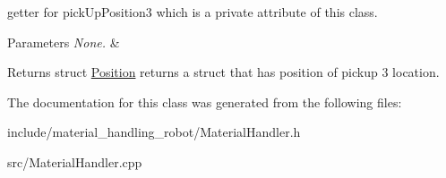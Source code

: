 getter for pick\+Up\+Position3 which is a private attribute of this class. 


\begin{DoxyParams}{Parameters}
{\em None.} & \\
\hline
\end{DoxyParams}
\begin{DoxyReturn}{Returns}
struct \hyperlink{structPosition}{Position} returns a struct that has position of pickup 3 location. 
\end{DoxyReturn}


The documentation for this class was generated from the following files\+:\begin{DoxyCompactItemize}
\item 
include/material\+\_\+handling\+\_\+robot/Material\+Handler.\+h\item 
src/Material\+Handler.\+cpp\end{DoxyCompactItemize}
